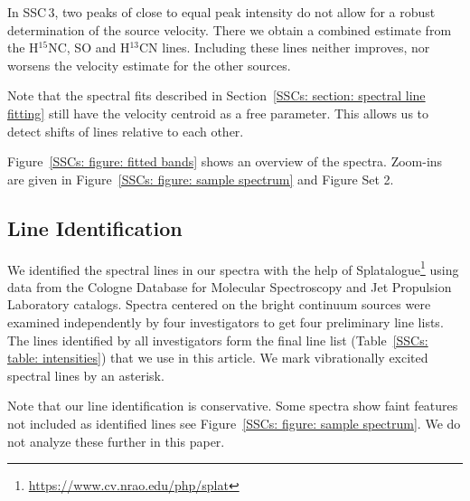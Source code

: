 In SSC\,3, two peaks of close to equal peak intensity do not allow for a robust determination of the source velocity. There we obtain a combined estimate from the H$^{15}$NC, SO and H$^{13}$CN lines. Including these lines neither improves, nor worsens the velocity estimate for the other sources.

Note that the spectral fits described in Section~\ref{SSCs: section: spectral line fitting} still have the velocity centroid as a free parameter. This allows us to detect shifts of lines relative to each other.

Figure~\ref{SSCs: figure: fitted bands} shows an overview of the spectra. Zoom-ins are given in Figure~\ref{SSCs: figure: sample spectrum} and Figure Set 2.

\subsection{Line Identification}\label{SSCs: section: line ID}
We identified the spectral lines in our spectra with the help of Splatalogue\footnote{\url{https://www.cv.nrao.edu/php/splat}} \citep{2007AAS...21113211R} using data from the Cologne Database for Molecular Spectroscopy \citep[CDMS\footnote{\url{https://cdms.astro.uni-koeln.de/}},][]{2005JMoSt.742..215M} and
Jet Propulsion Laboratory \citep[JPL,][]{1998JQSRT..60..883P} catalogs. Spectra centered on the bright continuum sources were examined independently by four investigators to get four preliminary line lists. 
The lines identified by all investigators form the final line list (Table~\ref{SSCs: table: intensities}) that we use in this article.
We mark vibrationally excited spectral lines by an asterisk.

Note that our line identification is conservative. Some spectra show faint features not included as identified lines see Figure~\ref{SSCs: figure: sample spectrum}. We do not analyze these further in this paper.

